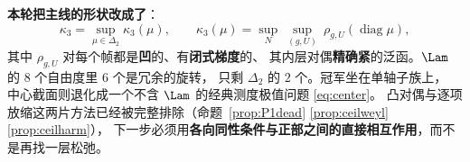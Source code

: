 \textbf{本轮把主线的形状改成了}：
\[
\kappa_3=\sup_{\mu\in\Delta_2}\kappa_3(\mu),\qquad
\kappa_3(\mu)=\sup_{N}\ \sup_{(g,U)}\ \rho_{g,U}(\operatorname{diag}\mu),
\]
其中 $\rho_{g,U}$ 对每个帧都是\textbf{凹}的、有\textbf{闭式梯度}的、
其内层对偶\textbf{精确紧}的泛函。$\Lam$ 的 $8$ 个自由度里 $6$ 个是冗余的旋转，
只剩 $\Delta_2$ 的 $2$ 个。冠军坐在单轴子族上，
中心截面则退化成一个不含 $\Lam$ 的经典测度极值问题 \eqref{eq:center}。
凸对偶与逐项放缩这两片方法已经被完整排除（命题~\ref{prop:P1dead}%
\ref{prop:ceilweyl}\ref{prop:ceilharm}），
下一步必须用\textbf{各向同性条件与正部之间的直接相互作用}，而不是再找一层松弛。


